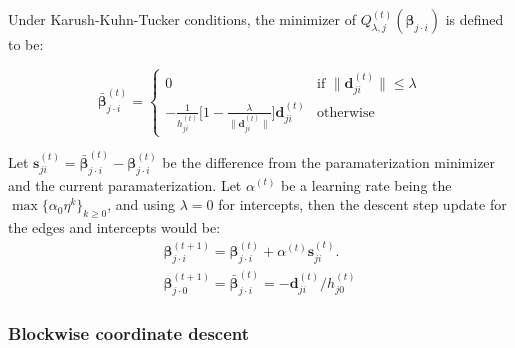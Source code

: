 \documentclass[twoside,11pt]{article}
\begin{document}
Under Karush-Kuhn-Tucker conditions, the minimizer of $Q_{\lambda,j}^{(t)}(\bm\beta_{j\cdot i})$ is defined to be:

\begin{equation}
    \bar{\bm\beta}_{j\cdot i}^{(t)}
    =\begin{cases} 
    0 & \text{if }\lVert\bm d_{ji}^{(t)}\rVert \leq \lambda\\
    -\frac{1}{h_{ji}^{(t)}}\Bigg[1-\frac{\lambda}{\lVert\bm d_{ji}^{(t)}\rVert} \Bigg]\bm d_{ji}^{(t)} & \text{otherwise} 
   \end{cases}
   \label{eq:2.15}
\end{equation}

Let $\bm s_{ji}^{(t)}=\bar{\bm\beta}_{j\cdot i}^{(t)}-\bm\beta_{j\cdot i}^{(t)}$ be the difference from the paramaterization minimizer and the current paramaterization. Let $\alpha^{(t)}$ be a learning rate being the $\max\{\alpha_0 \eta^k\}_{k\geq 0}$, and using $\lambda = 0$ for intercepts, then the descent step update for the edges and intercepts would be:
\begin{align}
    \bm\beta_{j\cdot i}^{(t+1)}=\bm\beta_{j\cdot i}^{(t)}+\alpha^{(t)}\bm s_{ji}^{(t)}.\label{eq:2.16}\\
    \bm\beta_{j\cdot 0}^{(t+1)}=\bar{\bm\beta}_{j\cdot i}^{(t)}=-\bm d_{ji}^{(t)}/h_{j0}^{(t)}\label{eq:2.17}
\end{align}


\subsubsection{Blockwise coordinate descent}
\end{document}
